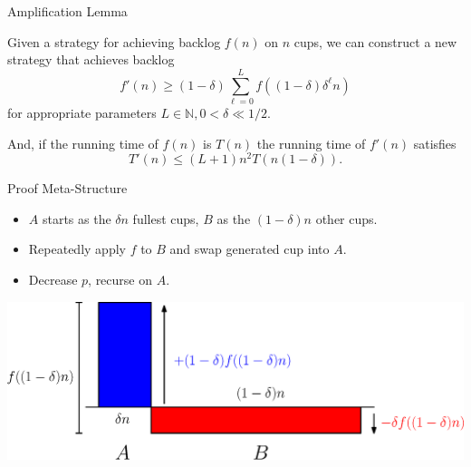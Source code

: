 \documentclass[xcolor=x11names, svgnames, rgb]{beamer}
\begin{document}
\begin{frame}[t]{Amplification Lemma}
  \begin{lemma}
    Given a strategy for achieving backlog $f(n)$ on $n$ cups, we can construct a new strategy that achieves backlog 
    $$f'(n) \ge (1-\delta)\sum_{\ell=0}^L f((1-\delta)\delta^\ell n)$$
    for appropriate parameters $L\in\mathbb{N}, 0<\delta\ll 1/2$.

    And, if the running time of $f(n)$ is $T(n)$ the running time of $f'(n)$ satisfies
    $$T'(n) \le (L+1)n^2 T(n(1-\delta)).$$
  \end{lemma}
\end{frame}

\begin{frame}[t]{Proof Meta-Structure}
  \begin{itemize}
    \item $A$ starts as the $\delta n$ fullest cups, $B$ as the $(1-\delta)n$ other cups.
    \item Repeatedly apply $f$ to $B$ and swap generated cup into $A$. 
    \item Decrease $p$, recurse on $A$.
  \end{itemize} 
  \vspace{0.5cm}
  \includegraphics[width=\linewidth]{amplificationImgs/delta_one_minus_delta.eps}
\end{frame}
\end{document}
